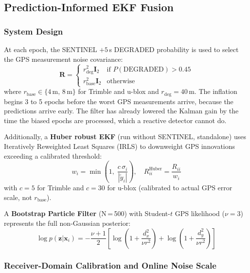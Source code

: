 \documentclass[12pt,a4paper]{article}
\begin{document}
\subsection{Prediction-Informed EKF Fusion}

\subsubsection{System Design}

At each epoch, the SENTINEL $+5$\,s DEGRADED probability is used to select the GPS
measurement noise covariance:
\begin{equation}
  \mathbf{R} = \begin{cases}
    r_\mathrm{deg}^2 \mathbf{I}_2 & \text{if } P(\text{DEGRADED}) > 0.45 \\
    r_\mathrm{base}^2 \mathbf{I}_2 & \text{otherwise}
  \end{cases}
\end{equation}
where $r_\mathrm{base} \in \{4\,\mathrm{m},\, 8\,\mathrm{m}\}$ for Trimble and u-blox
and $r_\mathrm{deg} = 40$\,m.
The inflation begins 3 to 5 epochs before the worst GPS measurements arrive, because the
predictions arrive early. The filter has already lowered the Kalman gain by the time the
biased epochs are processed, which a reactive detector cannot do.

Additionally, a \textbf{Huber robust EKF} (run without SENTINEL, standalone) uses
Iteratively Reweighted Least Squares (IRLS) to downweight GPS innovations exceeding a
calibrated threshold:
\begin{equation}
  w_i = \min\!\left(1,\; \frac{c \,\sigma_i}{|\tilde{y}_i|}\right), \quad
  R_{ii}^{\mathrm{Huber}} = \frac{R_{ii}}{w_i}
\end{equation}
with $c = 5$ for Trimble and $c = 30$ for u-blox (calibrated to actual GPS error scale,
not $r_\mathrm{base}$).

A \textbf{Bootstrap Particle Filter} (N\,=\,500) with Student-$t$ GPS likelihood
($\nu = 3$) represents the full non-Gaussian posterior:
\begin{equation}
  \log p(\mathbf{z}|\mathbf{x}_i) = -\frac{\nu+1}{2}
  \left[\log\!\left(1 + \frac{d_x^2}{\nu r^2}\right) +
        \log\!\left(1 + \frac{d_y^2}{\nu r^2}\right)\right]
\end{equation}

\subsubsection{Receiver-Domain Calibration and Online Noise Scale}
\end{document}
